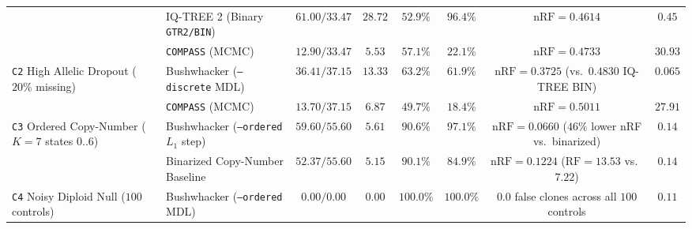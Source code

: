 \documentclass[12pt]{article}
\begin{document}
\begin{table}[H]
{\begin{tabular}{@{}llcccccc@{}}
& IQ-TREE 2 (Binary \texttt{GTR2/BIN}) & $61.00 / 33.47$ & $28.72$ & $52.9\%$ & $96.4\%$ & $\text{nRF} = 0.4614$ & $0.45$ \\
& \texttt{COMPASS} (MCMC) & $12.90 / 33.47$ & $5.53$ & $57.1\%$ & $22.1\%$ & $\text{nRF} = 0.4733$ & $30.93$ \\
\texttt{C2} High Allelic Dropout ($20\%$ missing) & Bushwhacker (\texttt{--discrete} MDL) & $36.41 / 37.15$ & $13.33$ & $63.2\%$ & $61.9\%$ & $\text{nRF} = 0.3725$ (vs.\ $0.4830$ IQ-TREE BIN) & $0.065$ \\
& \texttt{COMPASS} (MCMC) & $13.70 / 37.15$ & $6.87$ & $49.7\%$ & $18.4\%$ & $\text{nRF} = 0.5011$ & $27.91$ \\
\texttt{C3} Ordered Copy-Number ($K=7$ states $0..6$) & Bushwhacker (\texttt{--ordered} $L_1$ step) & $59.60 / 55.60$ & $5.61$ & $90.6\%$ & $97.1\%$ & $\text{nRF} = 0.0660$ ($46\%$ lower nRF vs.\ binarized) & $0.14$ \\
& Binarized Copy-Number Baseline & $52.37 / 55.60$ & $5.15$ & $90.1\%$ & $84.9\%$ & $\text{nRF} = 0.1224$ ($\text{RF} = 13.53$ vs.\ $7.22$) & $0.14$ \\
\texttt{C4} Noisy Diploid Null ($100$ controls) & Bushwhacker (\texttt{--ordered} MDL) & $0.00 / 0.00$ & $0.00$ & $100.0\%$ & $100.0\%$ & $0.0$ false clones across all $100$ controls & $0.11$ \\
\bottomrule
\end{tabular}%
}
\end{table}
\end{document}
